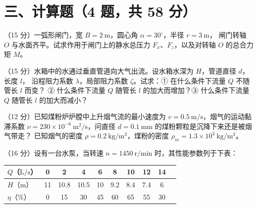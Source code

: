 \section*{三、计算题（4 题，共 58 分）}

\begin{ti}

\item （15 分）一弧形闸门，宽 $B=2\ \mathrm{m}$，圆心角 $\alpha=30^{\circ}$，半径 $r=3\ \mathrm{m}$，
闸门转轴 $O$ 与水面齐平。试求作用于闸门上的静水总压力 $F_x$、$F_z$，以及对转轴 $O$ 的总合力矩 $M$。

\item （15 分）水箱中的水通过垂直管道向大气出流。设水箱水深为 $H$，管道直径 $d$，长度 $l$，
沿程阻力系数 $\lambda$，局部阻力系数 $\zeta$。试求：① 在什么条件下流量 $Q$ 不随管长 $l$ 而变？
② 什么条件下流量 $Q$ 随管长 $l$ 的加大而增加？③ 什么条件下流量 $Q$ 随管长 $l$ 的加大而减小？

\item （12 分）已知煤粉炉炉膛中上升烟气流的最小速度为 $v=0.5\ \mathrm{m/s}$，烟气的运动黏滞系数
$\nu=230\times10^{-6}\ \mathrm{m^2/s}$，问直径 $d=0.1\ \mathrm{mm}$ 的煤粉颗粒是沉降下来还是被烟气带走？
已知烟气的密度 $\rho=0.2\ \mathrm{kg/m^3}$，煤粉的密度 $\rho_m=1.3\times10^{3}\ \mathrm{kg/m^3}$。

\item （16 分）设有一台水泵，当转速 $n=1450\ \mathrm{r/min}$ 时，其性能参数列于下表：

\begin{center}
\begin{tabular}{@{}lccccccccc@{}}
\toprule
$Q$（$\mathrm{L/s}$） & 0 & 2 & 4 & 6 & 8 & 10 & 12 & 14 \\
\midrule
$H$（$\mathrm{m}$） & 11 & 10.8 & 10.5 & 10 & 9.2 & 8.4 & 7.4 & 6 \\
$\eta$（\%） & 0 & 15 & 30 & 45 & 60 & 65 & 55 & 30 \\
\bottomrule
\end{tabular}
\end{center}


\end{ti}
